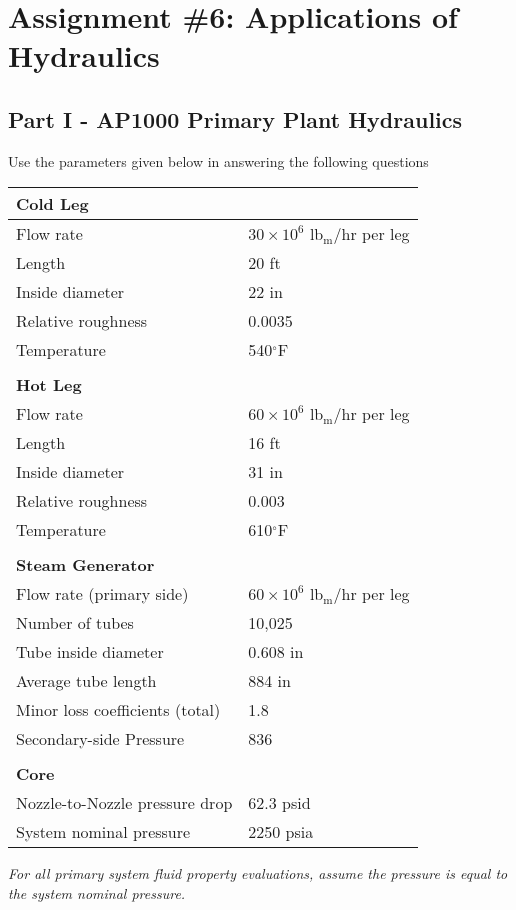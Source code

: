 \chapter{Assignment \#6: Applications of Hydraulics}
\label{ch:ass6}


\begin{fullwidth}
\section{Part I - AP1000 Primary Plant Hydraulics}
Use the parameters given below in answering the following questions

\begin{table}
\begin{tabular}{ l | l }
\toprule
\textbf{Cold Leg} & \\
\hline
Flow rate & $30 \times 10^{6}$ lb$_{\text{m}}$/hr per leg \\
Length & 20 ft \\
Inside diameter & 22 in \\
Relative roughness & 0.0035 \\
Temperature & 540$^{\circ}$F \\

   & \\
\textbf{Hot Leg} & \\
\hline
Flow rate & $60 \times 10^{6}$ lb$_{\text{m}}$/hr per leg \\
Length & 16 ft \\
Inside diameter & 31 in \\
Relative roughness & 0.003 \\
Temperature & 610$^{\circ}$F \\
  & \\
\textbf{Steam Generator} & \\
\hline
Flow rate (primary side) & $60 \times 10^6$ lb$_{\text{m}}$/hr per leg \\
Number of tubes & 10,025 \\
Tube inside diameter & 0.608 in \\
Average tube length & 884 in \\
Minor loss coefficients (total) & 1.8 \\
Secondary-side Pressure & 836 \\
 & \\
\textbf{Core} & \\
\hline
Nozzle-to-Nozzle pressure drop & 62.3 psid \\
System nominal pressure & 2250 psia \\
\bottomrule
\end{tabular}
\end{table}
\emph{For all primary system fluid property evaluations, assume the pressure is equal to the system nominal pressure.}


\end{fullwidth}
